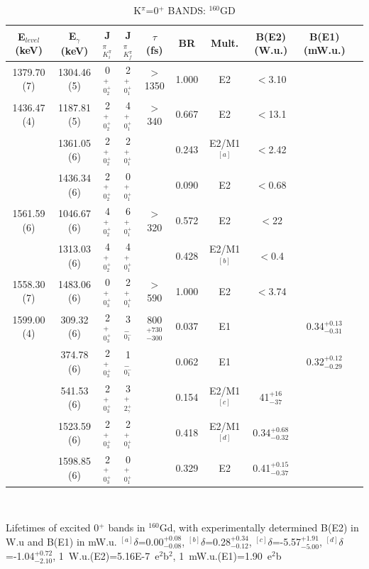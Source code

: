 \begin{landscape}
\begin{table}[h!]
\begin{center}
\caption{K$^\pi$=0$^+$ BANDS: $^{160}$GD  \label{tab:160Gd_0s_all}}
\begin{tabular}{cccccccccc}
E$_{level}$ (keV) & E$_\gamma$ (keV) & J$^\pi_{K^\pi_i}$ & J$^\pi_{K^\pi_f}$ & $\tau$ (fs) & BR & Mult. &  B(E2) (W.u.) & B(E1) (mW.u.)\\
\hline
\hline
1379.70 (7) & 1304.46 (5) & 0$^+_{0^+_2}$ & 2$^+_{0^+_1}$ & $>$1350 & 1.000 & E2 & $<$3.10 & \\
1436.47 (4) & 1187.81 (5) & 2$^+_{0^+_2}$ & 4$^+_{0^+_1}$ & $>$340  & 0.667 & E2 & $<$13.1 & \\
            & 1361.05 (6) & 2$^+_{0^+_2}$ & 2$^+_{0^+_1}$ &         & 0.243 & E2/M1$^{[a]}$ & $<$2.42 & \\
            & 1436.34 (6) & 2$^+_{0^+_2}$ & 0$^+_{0^+_1}$ &         & 0.090 & E2 & $<$0.68 & \\
1561.59 (6) & 1046.67 (6) & 4$^+_{0^+_2}$ & 6$^+_{0^+_1}$ & $>$320  & 0.572 & E2 & $<$22 & \\
            & 1313.03 (6) & 4$^+_{0^+_2}$ & 4$^+_{0^+_1}$ &         & 0.428 & E2/M1$^{[b]}$ & $<$0.4 & \\   
            \hline
1558.30 (7) & 1483.06 (6) & 0$^+_{0^+_3}$ & 2$^+_{0^+_1}$ & $>$590  & 1.000 & E2 & $<$3.74 & \\
1599.00 (4) &  309.32 (6) & 2$^+_{0^+_3}$ & 3$^-_{0^-_1}$ & 800$^{+730}_{-300}$  & 0.037 & E1 &  & 0.34$^{+0.13}_{-0.31}$ \\
            &  374.78 (6) & 2$^+_{0^+_3}$ & 1$^-_{0^-_1}$ &              & 0.062 & E1 &  & 0.32$^{+0.12}_{-0.29}$ \\
            &  541.53 (6) & 2$^+_{0^+_3}$ & 3$^+_{2^+_\gamma}$ &         & 0.154 & E2/M1$^{[c]}$ & 41$^{+16}_{-37}$ & \\     
            & 1523.59 (6) & 2$^+_{0^+_3}$ & 2$^+_{0^+_1}$ &              & 0.418 & E2/M1$^{[d]}$ & 0.34$^{+0.68}_{-0.32}$ & \\
            & 1598.85 (6) & 2$^+_{0^+_3}$ & 0$^+_{0^+_1}$ &              & 0.329 & E2 & 0.41$^{+0.15}_{-0.37}$ & \\
            \hline

\end{tabular}\\ \vspace{10pt} \end{center}
Lifetimes of excited 0$^+$ bands in $^{160}$Gd, with experimentally determined B(E2) in W.u and B(E1) in mW.u.
$^{[a]}\delta$=0.00$^{+0.08}_{-0.08}$, $^{[b]}\delta$=0.28$^{+0.34}_{-0.12}$, $^{[c]}\delta$=-5.57$^{+1.91}_{-5.00}$, $^{[d]}\delta$=-1.04$^{+0.72}_{-2.10}$,%
1~W.u.(E2)=5.16E-7~e$^2$b$^2$, 1~mW.u.(E1)=1.90~e$^2$b\\
\end{table}
\end{landscape}

